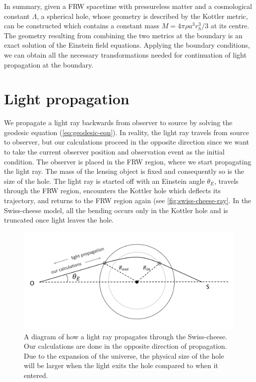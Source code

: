 In summary, given a FRW spacetime with pressureless matter and a cosmological constant $\Lambda$, a spherical hole, whose geometry is described by the Kottler metric, can be constructed which contains a constant mass $M = 4\pi \rho a^3 r_h^3/3$ at its centre. The geometry resulting from combining the two metrics at the boundary is an exact solution of the Einstein field equations. Applying the boundary conditions, we can obtain all the necessary transformations needed for continuation of light propagation at the boundary. 

\section{Light propagation}

We propagate a light ray backwards from observer to source by solving the geodesic equation (\autoref{eq:geodesic-eqn}). In reality, the light ray travels from source to observer, but our calculations proceed in the opposite direction since we want to take the current observer position and observation event as the initial condition. The observer is placed in the FRW region, where we start propagating the light ray. The mass of the lensing object is fixed and consequently so is the size of the hole. The light ray is started off with an Einstein angle $\theta_{E}$, travels through the FRW region, encounters the Kottler hole which deflects its trajectory, and returns to the FRW region again (see \autoref{fig:swiss-cheese-ray}. In the Swiss-cheese model, all the bending occurs only in the Kottler hole and is truncated once light leaves the hole. 

\begin{figure}
  \centering
  \includegraphics[height=0.4\linewidth]{images/swiss-cheese-ray2-cropped.pdf}
  \caption{A diagram of how a light ray propagates through the Swiss-cheese. Our calculations are done in the opposite direction of propagation. Due to the expansion of the universe, the physical size of the hole will be larger when the light exits the hole compared to when it entered.}
  \label{fig:swiss-cheese-ray}
\end{figure}

